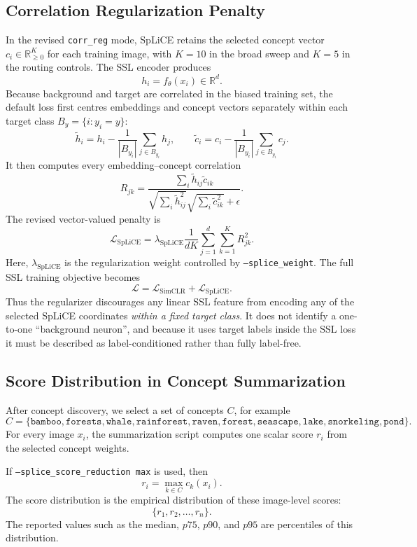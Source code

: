 \documentclass[11pt,a4paper]{article}
\begin{document}
\subsection{Correlation Regularization Penalty}

In the revised \texttt{corr\_reg} mode, SpLiCE retains the selected concept
vector $c_i\in\mathbb{R}^{K}_{\geq0}$ for each training image, with $K=10$ in
the broad sweep and $K=5$ in the routing controls. The SSL encoder produces
\[
h_i = f_{\theta}(x_i) \in \mathbb{R}^d.
\]
Because background and target are correlated in the biased training set, the
default loss first centres embeddings and concept vectors separately within
each target class $B_y=\{i:y_i=y\}$:
\[
\widetilde h_i=h_i-\frac{1}{|B_{y_i}|}\sum_{j\in B_{y_i}}h_j,
\qquad
\widetilde c_i=c_i-\frac{1}{|B_{y_i}|}\sum_{j\in B_{y_i}}c_j.
\]
It then computes every embedding--concept correlation
\[
R_{jk}=
\frac{\sum_i \widetilde h_{ij}\widetilde c_{ik}}
{\sqrt{\sum_i\widetilde h_{ij}^{2}}
 \sqrt{\sum_i\widetilde c_{ik}^{2}}+\epsilon}.
\]
The revised vector-valued penalty is
\[
\mathcal{L}_{\mathrm{SpLiCE}}
=
\lambda_{\mathrm{SpLiCE}}
\frac{1}{dK}
\sum_{j=1}^{d}\sum_{k=1}^{K}R_{jk}^2.
\]
Here, \(\lambda_{\mathrm{SpLiCE}}\) is the regularization weight controlled by
\texttt{--splice\_weight}. The full SSL training objective becomes
\[
\mathcal{L}
=
\mathcal{L}_{\mathrm{SimCLR}}
+
\mathcal{L}_{\mathrm{SpLiCE}}.
\]
Thus the regularizer discourages any linear SSL feature from encoding any of
the selected SpLiCE coordinates \emph{within a fixed target class}. It does not
identify a one-to-one ``background neuron'', and because it uses target labels
inside the SSL loss it must be described as label-conditioned rather than fully
label-free.

\subsection{Score Distribution in Concept Summarization}

After concept discovery, we select a set of concepts \(C\), for example
\[
C =
\{
\texttt{bamboo},
\texttt{forests},
\texttt{whale},
\texttt{rainforest},
\texttt{raven},
\texttt{forest},
\texttt{seascape},
\texttt{lake},
\texttt{snorkeling},
\texttt{pond}
\}.
\]
For every image \(x_i\), the summarization script computes one scalar score
\(r_i\) from the selected concept weights.

If \texttt{--splice\_score\_reduction max} is used, then
\[
r_i
=
\max_{k \in C} c_k(x_i).
\]
The score distribution is the empirical distribution of these image-level
scores:
\[
\{r_1,r_2,\ldots,r_n\}.
\]
The reported values such as the median, \(p75\), \(p90\), and \(p95\) are
percentiles of this distribution.
\end{document}
